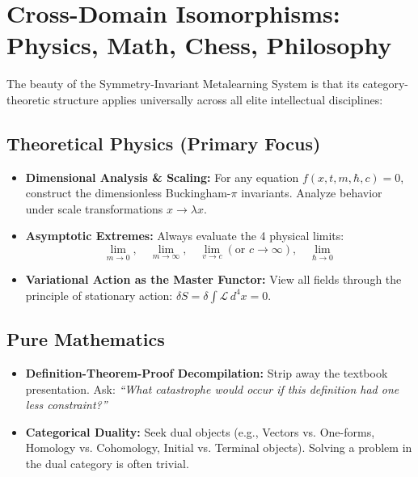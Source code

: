 \documentclass[11pt,a4paper]{article}
\begin{document}
\section{Cross-Domain Isomorphisms: Physics, Math, Chess, Philosophy}

The beauty of the Symmetry-Invariant Metalearning System is that its category-theoretic structure applies universally across all elite intellectual disciplines:

\subsection{Theoretical Physics (Primary Focus)}
\begin{itemize}
    \item \textbf{Dimensional Analysis \& Scaling:} For any equation $f(x, t, m, \hbar, c) = 0$, construct the dimensionless Buckingham-$\pi$ invariants. Analyze behavior under scale transformations $x \to \lambda x$.
    \item \textbf{Asymptotic Extremes:} Always evaluate the 4 physical limits:
    \[
    \lim_{m \to 0}, \quad \lim_{m \to \infty}, \quad \lim_{v \to c} (\text{or } c \to \infty), \quad \lim_{\hbar \to 0}
    \]
    \item \textbf{Variational Action as the Master Functor:} View all fields through the principle of stationary action: $\delta S = \delta \int \mathcal{L} \, d^4x = 0$.
\end{itemize}

\subsection{Pure Mathematics}
\begin{itemize}
    \item \textbf{Definition-Theorem-Proof Decompilation:} Strip away the textbook presentation. Ask: \textit{``What catastrophe would occur if this definition had one less constraint?''}
    \item \textbf{Categorical Duality:} Seek dual objects (e.g., Vectors vs. One-forms, Homology vs. Cohomology, Initial vs. Terminal objects). Solving a problem in the dual category is often trivial.
\end{itemize}
\end{document}
